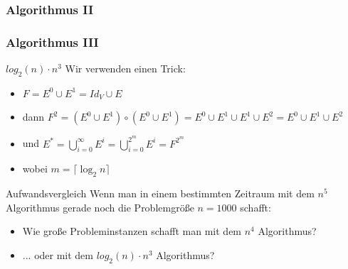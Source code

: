 \begin{frame}
	\frametitle{Algorithmus II}



\end{frame}

\begin{frame}
	\frametitle{Algorithmus III}
	\begin{block}{$log_2(n) \cdot n^3$}
		Wir verwenden einen Trick: \pause
		\begin{itemize}
			\item $F=E^0\cup E^1= {Id}_V\cup E$ \pause
			\item dann $F^2 = (E^0\cup E^1)\circ(E^0\cup E^1)= E^0 \cup E^1\cup E^1 \cup E^2= E^0 \cup E^1 \cup E^2$ \pause
			\item und $E^* = \bigcup_{i=0}^{\infty} E^i = \bigcup_{i=0}^{2^m} E^i = F^{2^m}$ \pause
			\item wobei $m=\lceil \log_2 n \rceil$
		\end{itemize}
	\end{block} \pause
\end{frame}

\begin{frame}
	\begin{block}{Aufwandsvergleich}
		Wenn man in einem bestimmten Zeitraum mit dem $n^5$ Algorithmus gerade noch die Problemgröße $n=1000$ schafft: 
	  \begin{itemize}
		  \item Wie große Probleminstanzen schafft man mit dem $n^4$ Algorithmus? \pause
		  \item ... oder mit dem $log_2(n) \cdot n^3$ Algorithmus?
	  \end{itemize}
	\end{block}
\end{frame}

